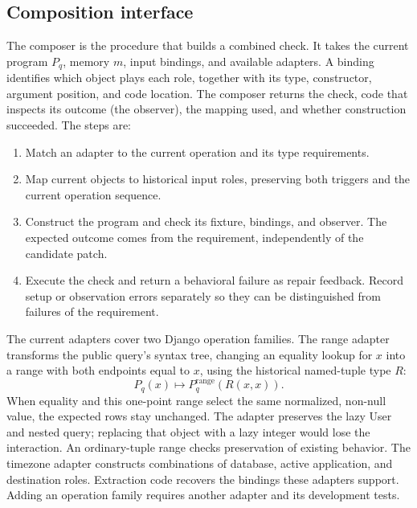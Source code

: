 \subsection{Composition interface}
The composer is the procedure that builds a combined check. It takes the
current program $P_q$, memory $m$, input bindings, and available adapters.
A binding identifies which object plays each role, together with its type,
constructor, argument position, and code location. The composer returns the
check, code that inspects its outcome (the observer), the mapping used, and
whether construction succeeded.
The steps are:
\begin{enumerate}
\item Match an adapter to the current operation and its type requirements.
\item Map current objects to historical input roles, preserving both triggers
and the current operation sequence.
\item Construct the program and check its fixture, bindings, and observer.
The expected outcome comes from the requirement, independently of the candidate patch.
\item Execute the check and return a behavioral failure as repair feedback.
Record setup or observation errors separately so they can be distinguished
from failures of the requirement.
\end{enumerate}

The current adapters cover two Django operation families. The range adapter
transforms the public query's syntax tree, changing an equality lookup for
$x$ into a range with both endpoints equal to $x$, using the historical
named-tuple type $R$:
\begin{equation}
 P_q(x)\longmapsto P_q^{\mathrm{range}}(R(x,x)).
 \label{eq:composition}
\end{equation}
When equality and this one-point range select the same normalized, non-null
value, the expected rows stay unchanged. The adapter preserves the lazy User
and nested query; replacing that object with a lazy integer would lose the
interaction. An ordinary-tuple range checks preservation of existing behavior.
The timezone adapter constructs combinations of database, active application,
and destination roles. Extraction code recovers the bindings these adapters
support. Adding an operation family requires another adapter and its
development tests.

